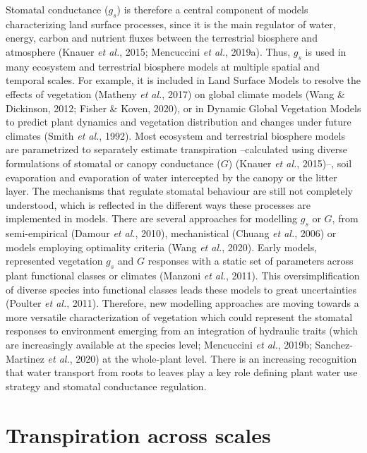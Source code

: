 \documentclass[11pt,twoside]{reedthesis}
\begin{document}
Stomatal conductance (\(g_s\)) is therefore a central component of
models characterizing land surface processes, since it is the main
regulator of water, energy, carbon and nutrient fluxes between the
terrestrial biosphere and atmosphere (Knauer \emph{et al.}, 2015;
Mencuccini \emph{et al.}, 2019a). Thus, \(g_s\) is used in many
ecosystem and terrestrial biosphere models at multiple spatial and
temporal scales. For example, it is included in Land Surface Models to
resolve the effects of vegetation (Matheny \emph{et al.}, 2017) on
global climate models (Wang \& Dickinson, 2012; Fisher \& Koven, 2020),
or in Dynamic Global Vegetation Models to predict plant dynamics and
vegetation distribution and changes under future climates (Smith
\emph{et al.}, 1992). Most ecosystem and terrestrial biosphere models
are parametrized to separately estimate transpiration --calculated using
diverse formulations of stomatal or canopy conductance (\(G\)) (Knauer
\emph{et al.}, 2015)--, soil evaporation and evaporation of water
intercepted by the canopy or the litter layer. The mechanisms that
regulate stomatal behaviour are still not completely understood, which
is reflected in the different ways these processes are implemented in
models. There are several approaches for modelling \(g_s\) or \(G\),
from semi-empirical (Damour \emph{et al.}, 2010), mechanistical (Chuang
\emph{et al.}, 2006) or models employing optimality criteria (Wang
\emph{et al.}, 2020). Early models, represented vegetation \(g_s\) and
\(G\) responses with a static set of parameters across plant functional
classes or climates (Manzoni \emph{et al.}, 2011). This
oversimplification of diverse species into functional classes leads
these models to great uncertainties (Poulter \emph{et al.}, 2011).
Therefore, new modelling approaches are moving towards a more versatile
characterization of vegetation which could represent the stomatal
responses to environment emerging from an integration of hydraulic
traits (which are increasingly available at the species level;
Mencuccini \emph{et al.}, 2019b; Sanchez-Martinez \emph{et al.}, 2020)
at the whole-plant level. There is an increasing recognition that water
transport from roots to leaves play a key role defining plant water use
strategy and stomatal conductance regulation.\par

\section{Transpiration across scales}\label{transpiration-across-scales}
\end{document}
